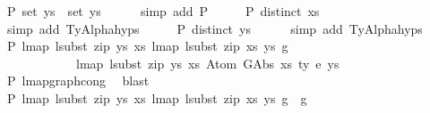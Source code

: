 \begin{isabellebody}
\ P{}{\isacharcolon}{\kern0pt}\ {\isachardoublequoteopen}set\ ys{\isacharprime}{\kern0pt}\ {\isacharequal}{\kern0pt}\ set\ ys{\isachardoublequoteclose}\isanewline
\ \ \ \ \isamarkupfalse%
\ {\isacharparenleft}{\kern0pt}simp\ add{\isacharcolon}{\kern0pt}\ P{}{\isacharparenright}{\kern0pt}\isanewline
\isanewline
\ \ \isamarkupfalse%
\ \isamarkupfalse%
\ P{}{\isacharcolon}{\kern0pt}\ {\isachardoublequoteopen}distinct\ xs{\isacharprime}{\kern0pt}{\isachardoublequoteclose}\isanewline
\ \ \ \ \isamarkupfalse%
\ {\isacharparenleft}{\kern0pt}simp\ add{\isacharcolon}{\kern0pt}\ TyAlpha{\isachardot}{\kern0pt}hyps{\isacharparenleft}{\kern0pt}{}{\isacharparenright}{\kern0pt}{\isacharparenright}{\kern0pt}\isanewline
\ \ \isamarkupfalse%
\ \isamarkupfalse%
\ P{}{\isacharcolon}{\kern0pt}\ {\isachardoublequoteopen}distinct\ ys{\isacharprime}{\kern0pt}{\isachardoublequoteclose}\isanewline
\ \ \ \ \isamarkupfalse%
\ {\isacharparenleft}{\kern0pt}simp\ add{\isacharcolon}{\kern0pt}\ TyAlpha{\isachardot}{\kern0pt}hyps{\isacharparenleft}{\kern0pt}{}{\isacharparenright}{\kern0pt}{\isacharparenright}{\kern0pt}\isanewline
\isanewline
\ \ \isamarkupfalse%
\ P{}{\isacharcolon}{\kern0pt}\ {\isachardoublequoteopen}lmap\ {\isacharparenleft}{\kern0pt}lsubst\ {\isacharparenleft}{\kern0pt}zip\ ys{\isacharprime}{\kern0pt}\ xs{\isacharprime}{\kern0pt}{\isacharparenright}{\kern0pt}{\isacharparenright}{\kern0pt}\ {\isacharparenleft}{\kern0pt}lmap\ {\isacharparenleft}{\kern0pt}lsubst\ {\isacharparenleft}{\kern0pt}zip\ xs{\isacharprime}{\kern0pt}\ ys{\isacharprime}{\kern0pt}{\isacharparenright}{\kern0pt}{\isacharparenright}{\kern0pt}\ g{\isacharparenright}{\kern0pt}\ {\isasymsimeq}\isanewline
\ \ \ \ \ \ \ \ \ \ \ \ lmap\ {\isacharparenleft}{\kern0pt}lsubst\ {\isacharparenleft}{\kern0pt}zip\ ys{\isacharprime}{\kern0pt}\ xs{\isacharprime}{\kern0pt}{\isacharparenright}{\kern0pt}{\isacharparenright}{\kern0pt}\ {\isacharparenleft}{\kern0pt}Atom\ {\isacharparenleft}{\kern0pt}GAbs\ xs\ ty{}\ e{\isacharparenright}{\kern0pt}\ ys{\isacharparenright}{\kern0pt}{\isachardoublequoteclose}\isanewline
\ \ \ \ \ \ \isamarkupfalse%
\ P{}\ lmap{\isacharunderscore}{\kern0pt}graph{\isacharunderscore}{\kern0pt}cong\ \isamarkupfalse%
\ blast\isanewline
\ \ \isamarkupfalse%
\ P{}{\isacharcolon}{\kern0pt}\ {\isachardoublequoteopen}lmap\ {\isacharparenleft}{\kern0pt}lsubst\ {\isacharparenleft}{\kern0pt}zip\ ys{\isacharprime}{\kern0pt}\ xs{\isacharprime}{\kern0pt}{\isacharparenright}{\kern0pt}{\isacharparenright}{\kern0pt}\ {\isacharparenleft}{\kern0pt}lmap\ {\isacharparenleft}{\kern0pt}lsubst\ {\isacharparenleft}{\kern0pt}zip\ xs{\isacharprime}{\kern0pt}\ ys{\isacharprime}{\kern0pt}{\isacharparenright}{\kern0pt}{\isacharparenright}{\kern0pt}\ g{\isacharparenright}{\kern0pt}\ {\isacharequal}{\kern0pt}\ g{\isachardoublequoteclose}\isanewline

\end{isabellebody}

